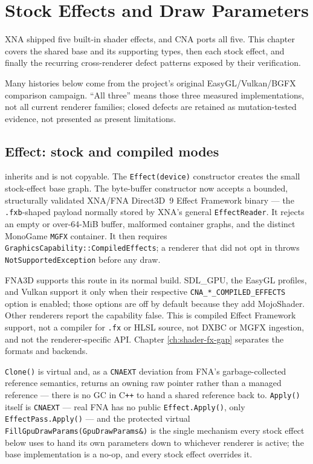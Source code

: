 \chapter{Stock Effects and Draw Parameters}
\label{ch:stock-effects}

XNA shipped five built-in shader effects, and CNA ports all five. This chapter covers the
shared  base and its supporting types, then each stock effect, and finally the
recurring cross-renderer defect patterns exposed by their verification.

Many histories below come from the project's original EasyGL/Vulkan/BGFX comparison campaign.
``All three'' means those three measured implementations, not all \RendererFamilyCount{} current
renderer families;
closed defects are retained as mutation-tested evidence, not presented as present limitations.

\section{Effect: stock and compiled modes}

 inherits  and is not copyable. The
\texttt{Effect(device)} constructor creates the small stock-effect base graph. The byte-buffer
constructor now accepts a bounded, structurally validated XNA/FNA Direct3D~9 Effect Framework
binary --- the \texttt{.fxb}-shaped payload normally stored by XNA's general
\texttt{EffectReader}. It rejects an empty or over-64-MiB buffer, malformed container graphs, and
the distinct MonoGame \texttt{MGFX} container. It then requires
\texttt{GraphicsCapability::CompiledEffects}; a renderer that did not opt in throws
\texttt{NotSupportedException} before any draw.

FNA3D supports this route in its normal build. SDL\_GPU, the EasyGL profiles, and Vulkan support it
only when their respective \texttt{CNA\_*\_COMPILED\_EFFECTS} option is enabled; those options are
off by default because they add MojoShader. Other renderers report the capability false. This is
compiled Effect Framework support, not a compiler for \texttt{.fx} or HLSL source, not DXBC or
MGFX ingestion, and not the renderer-specific  API. Chapter
\ref{ch:shader-fx-gap} separates the formats and backends.

\texttt{Clone()} is virtual and, as a
\texttt{CNAEXT} deviation from FNA's garbage-collected reference semantics, returns an owning
raw pointer rather than a managed reference --- there is no GC in C\texttt{++} to hand a
shared reference back to. \texttt{Apply()} itself is \texttt{CNAEXT} --- real FNA has no
public \texttt{Effect.Apply()}, only \texttt{EffectPass.Apply()} --- and the protected virtual
\texttt{FillGpuDrawParams(GpuDrawParams\&)} is the single mechanism every stock effect below
uses to hand its own parameters down to whichever renderer is active; the base implementation
is a no-op, and every stock effect overrides it.

